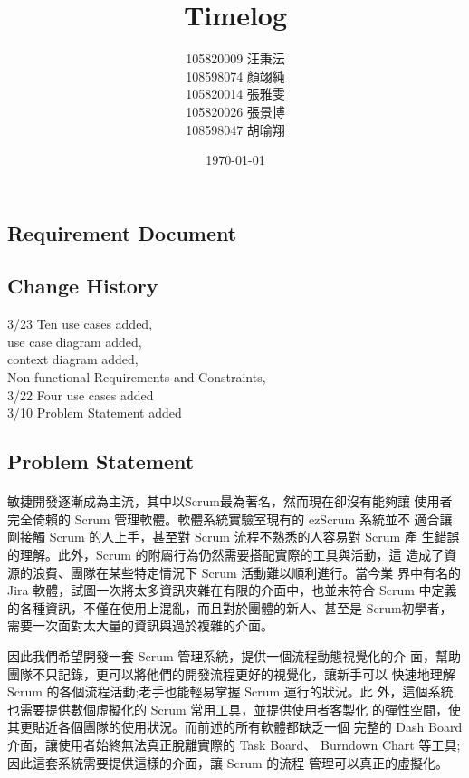 \documentclass[12pt, a4paper]{article}
\title{Timelog}
\author{105820009 汪秉沄\\
108598074 顏翊純\\
105820014 張雅雯\\
105820026 張景博\\
108598047 胡喻翔}
\date{\today}
\begin{document}
\begin{CJK*}{UTF8}{bkai}
\maketitle
\newpage

\tableofcontents
\newpage


\section{Requirement Document}
  \subsection{Change History}
  3/23 Ten use cases added,\\
    \indent use case diagram added,\\
    \indent context diagram added,\\
    \indent Non-functional Requirements and Constraints,\\
  3/22 Four use cases added\\
  3/10 Problem Statement added

  \subsection{Problem Statement}
  \paragraph{}
  敏捷開發逐漸成為主流，其中以Scrum最為著名，然而現在卻沒有能夠讓
使用者完全倚賴的 Scrum 管理軟體。軟體系統實驗室現有的 ezScrum 系統並不 適合讓剛接觸 Scrum 的人上手，甚至對 Scrum 流程不熟悉的人容易對 Scrum 產 生錯誤的理解。此外，Scrum 的附屬行為仍然需要搭配實際的工具與活動，這 造成了資源的浪費、團隊在某些特定情況下 Scrum 活動難以順利進行。當今業 界中有名的 Jira 軟體，試圖一次將太多資訊夾雜在有限的介面中，也並未符合 Scrum 中定義的各種資訊，不僅在使用上混亂，而且對於團體的新人、甚至是 Scrum初學者，需要一次面對太大量的資訊與過於複雜的介面。

因此我們希望開發一套 Scrum 管理系統，提供一個流程動態視覺化的介 面，幫助團隊不只記錄，更可以將他們的開發流程更好的視覺化，讓新手可以 快速地理解 Scrum 的各個流程活動;老手也能輕易掌握 Scrum 運行的狀況。此 外，這個系統也需要提供數個虛擬化的 Scrum 常用工具，並提供使用者客製化 的彈性空間，使其更貼近各個團隊的使用狀況。而前述的所有軟體都缺乏一個 完整的 Dash Board 介面，讓使用者始終無法真正脫離實際的 Task Board、 Burndown Chart 等工具;因此這套系統需要提供這樣的介面，讓 Scrum 的流程 管理可以真正的虛擬化。


\end{CJK*}
\end{document}
